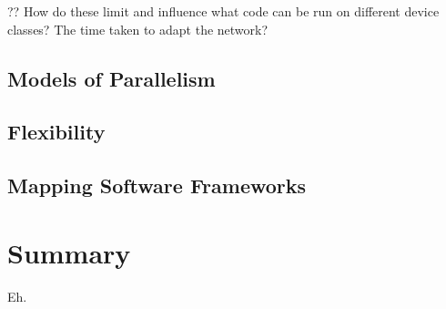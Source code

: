?? How do these limit and influence what code can be run on different device classes? The time taken to adapt the network?

\subsection{Models of Parallelism}

\subsection{Flexibility}

\subsection{Mapping Software Frameworks}

\section{Summary}
Eh. 
